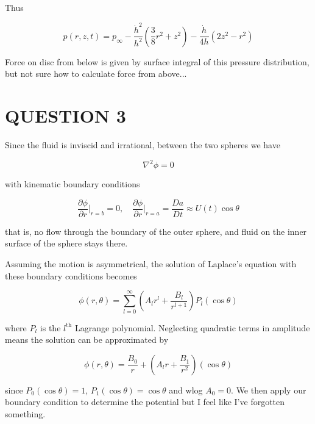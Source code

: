 \documentclass[a4paper]{article}
\begin{document}
Thus

\[ p(r,z,t) = p_{\infty} - \frac{\dot{h}^{2}}{h^{2}} \left(  \frac{3}{8} r^{2} + z^{2} \right) - \frac{\dot{h}}{4h}(2z^{2} - r^{2})  \]

Force on disc from below is given by surface integral of this pressure distribution, but not sure how to calculate force from above...

\section{QUESTION 3}





\begin{center}
\end{center}

Since the fluid is inviscid and irrational, between the two spheres we have 

\[ \nabla^{2} \phi = 0  \]

with kinematic boundary conditions 

\[ \frac{\partial \phi }{\partial r} \Big|_{r = b} = 0, \quad \frac{\partial \phi }{\partial r} \Big|_{r = a} = \frac{D a}{D t }  \approx U(t) \cos \theta \]

that is, no flow through the boundary of the outer sphere, and fluid on the inner surface of the sphere stays there. 

Assuming the motion is asymmetrical, the solution of Laplace's equation with these boundary conditions becomes

\[ \phi(r,\theta) = \sum_{l=0}^{\infty} \left(  A_{l} r^{l} + \frac{B_{l}}{r^{l+1}} \right)  P_{l} (\cos \theta) \]

where $ P_{l} $ is the $ l^{\text{th}} $ Lagrange polynomial. Neglecting quadratic terms in amplitude means the solution can be approximated by

\[ \phi(r,\theta) = \frac{B_{0}}{r} + \left(  A_{l} r + \frac{B_{1}}{r^{2}} \right) (\cos \theta) \] 

since $ P_{0}(\cos \theta) = 1 $, $ P_{1}(\cos \theta) = \cos \theta $ and wlog $ A_{0} = 0 $. We then apply our boundary condition to determine the potential but I feel like I've forgotten something. 
\end{document}
